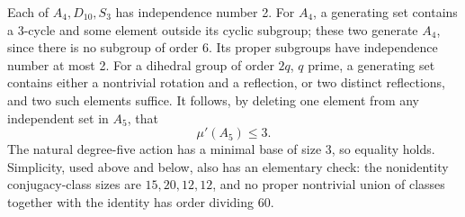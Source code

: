 \documentclass[11pt]{article}
\theoremstyle{remark}\newtheorem{remark}[theorem]{Remark}
\newcommand{\mup}{\mu'}
\begin{document}
Each of $A_4,D_{10},S_3$ has independence number 2. For $A_4$, a generating
set contains a 3-cycle and some element outside its cyclic subgroup; these
two generate $A_4$, since there is no subgroup of order 6. Its proper
subgroups have independence number at most 2. For a dihedral group of order
$2q$, $q$ prime, a generating set contains either a nontrivial rotation and
a reflection, or two distinct reflections, and two such elements suffice.
It follows, by deleting one element from any independent set in $A_5$, that
\begin{equation}\label{eq:A5rank}
                        \mup(A_5)\le3.
\end{equation}
The natural degree-five action has a minimal base of size 3, so equality holds.
Simplicity, used above and below, also has an elementary check: the nonidentity
conjugacy-class sizes are $15,20,12,12$, and no proper nontrivial union of
classes together with the identity has order dividing 60.
\end{document}
